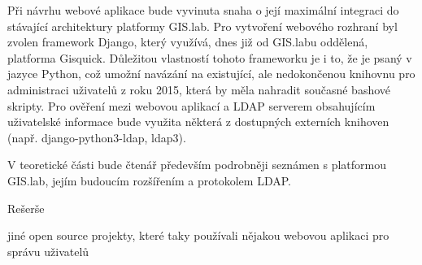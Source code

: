 Při návrhu webové aplikace bude vyvinuta snaha o její maximální integraci do stávající architektury platformy GIS.lab. Pro vytvoření webového rozhraní byl zvolen framework Django, který využívá, dnes již od GIS.labu oddělená, platforma Gisquick. Důležitou vlastností tohoto frameworku je i to, že je psaný v jazyce Python, což umožní navázání na existující, ale nedokončenou knihovnu pro administraci uživatelů z roku 2015, která by měla nahradit současné bashové skripty. Pro ověření mezi webovou aplikací a LDAP serverem obsahujícím uživatelské informace bude využita některá z dostupných externích knihoven (např. django-python3-ldap, ldap3). 

V teoretické části bude čtenář především podrobněji seznámen s platformou GIS.lab, jejím budoucím rozšířením a protokolem LDAP.

Rešerše

jiné open source projekty, které taky používali nějakou webovou aplikaci pro správu uživatelů